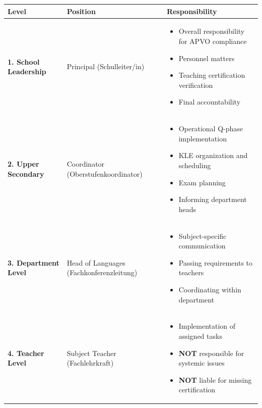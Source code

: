 \documentclass[11pt,a4paper]{article}
\begin{document}
\begin{center}
\begin{tabular}{>{\bfseries}p{3.5cm}p{3.5cm}p{6.5cm}}
\toprule
\textbf{Level} & \textbf{Position} & \textbf{Responsibility} \\
\midrule
1. School Leadership & Principal (Schulleiter/in) &
    \begin{itemize}[nosep,leftmargin=*]
        \item Overall responsibility for APVO compliance
        \item Personnel matters
        \item Teaching certification verification
        \item Final accountability
    \end{itemize} \\[1em]
2. Upper Secondary & Coordinator (Oberstufenkoordinator) &
    \begin{itemize}[nosep,leftmargin=*]
        \item Operational Q-phase implementation
        \item KLE organization and scheduling
        \item Exam planning
        \item Informing department heads
    \end{itemize} \\[1em]
3. Department Level & Head of Languages (Fachkonferenzleitung) &
    \begin{itemize}[nosep,leftmargin=*]
        \item Subject-specific communication
        \item Passing requirements to teachers
        \item Coordinating within department
    \end{itemize} \\[1em]
4. Teacher Level & Subject Teacher (Fachlehrkraft) &
    \begin{itemize}[nosep,leftmargin=*]
        \item Implementation of assigned tasks
        \item \textbf{NOT} responsible for systemic issues
        \item \textbf{NOT} liable for missing certification
    \end{itemize} \\
\bottomrule
\end{tabular}
\end{center}
\end{document}
